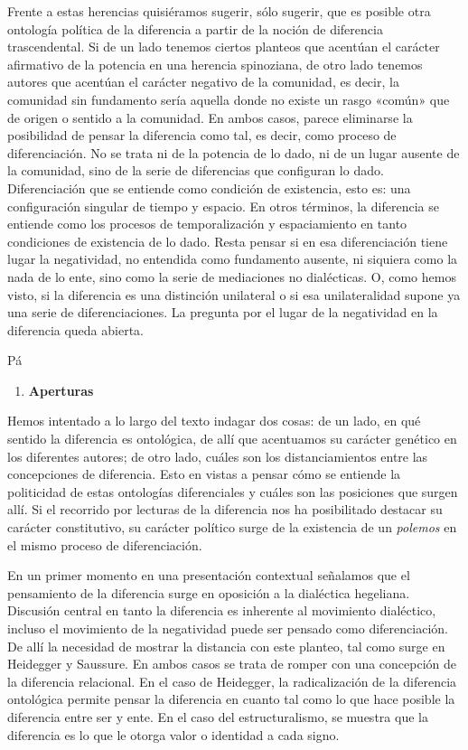 Frente a estas herencias quisiéramos sugerir, sólo sugerir, que es posible otra ontología política de la diferencia a partir de la noción de diferencia trascendental. Si de un lado tenemos ciertos planteos que acentúan el carácter afirmativo de la potencia en una herencia spinoziana, de otro lado tenemos autores que acentúan el carácter negativo de la comunidad, es decir, la comunidad sin fundamento sería aquella donde no existe un rasgo «común» que de origen o sentido a la comunidad. En ambos casos, parece eliminarse la posibilidad de pensar la diferencia como tal, es decir, como proceso de diferenciación. No se trata ni de la potencia de lo dado, ni de un lugar ausente de la comunidad, sino de la serie de diferencias que configuran lo dado. Diferenciación que se entiende como condición de existencia, esto es: una configuración singular de tiempo y espacio. En otros términos, la diferencia se entiende como los procesos de temporalización y espaciamiento en tanto condiciones de existencia de lo dado. Resta pensar si en esa diferenciación tiene lugar la negatividad, no entendida como fundamento ausente, ni siquiera como la nada de lo ente, sino como la serie de mediaciones no dialécticas. O, como hemos visto, si la diferencia es una distinción unilateral o si esa unilateralidad supone ya una serie de diferenciaciones. La pregunta por el lugar de la negatividad en la diferencia queda abierta.

Pá

\begin{enumerate}
\def\labelenumi{\arabic{enumi}.}
\item
  \textbf{Aperturas}
\end{enumerate}

Hemos intentado a lo largo del texto indagar dos cosas: de un lado, en qué sentido la diferencia es ontológica, de allí que acentuamos su carácter genético en los diferentes autores; de otro lado, cuáles son los distanciamientos entre las concepciones de diferencia. Esto en vistas a pensar cómo se entiende la politicidad de estas ontologías diferenciales y cuáles son las posiciones que surgen allí. Si el recorrido por lecturas de la diferencia nos ha posibilitado destacar su carácter constitutivo, su carácter político surge de la existencia de un \emph{polemos} en el mismo proceso de diferenciación.

En un primer momento en una presentación contextual señalamos que el pensamiento de la diferencia surge en oposición a la dialéctica hegeliana. Discusión central en tanto la diferencia es inherente al movimiento dialéctico, incluso el movimiento de la negatividad puede ser pensado como diferenciación. De allí la necesidad de mostrar la distancia con este planteo, tal como surge en Heidegger y Saussure. En ambos casos se trata de romper con una concepción de la diferencia relacional. En el caso de Heidegger, la radicalización de la diferencia ontológica permite pensar la diferencia en cuanto tal como lo que hace posible la diferencia entre ser y ente. En el caso del estructuralismo, se muestra que la diferencia es lo que le otorga valor o identidad a cada signo.

